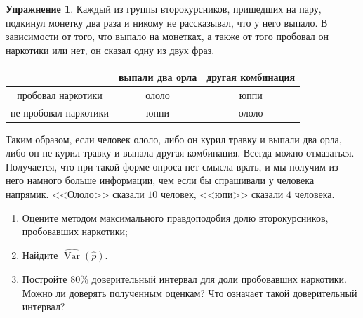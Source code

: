 \documentclass[12pt, a4paper, oneside]{extreport}
\DeclareMathOperator{\Var}{Var}
\theoremstyle{plain}              %
\theoremstyle{definition}         %
\newtheorem{problem}{\color{myblue} Упражнение}
\begin{document}
\begin{problem} 
Каждый из группы второкурсников, пришедших на пару, подкинул монетку два раза и никому не рассказывал, что у него выпало. В зависимости от того, что выпало на монетках, а также от того пробовал он наркотики или нет, он сказал одну из двух фраз.
	
	\begin{center}
		\begin{tabular}{c|c|c}
		                                 &  выпали два орла   & другая комбинация   \\ \hline
пробовал наркотики      &   ололо                     &   юппи       \\ \hline
не пробовал наркотики &	  юппи	                     &   ололо      \\
		\end{tabular}
	\end{center}
	
Таким образом, если человек ололо, либо он курил травку и выпали два орла, либо он не курил травку и выпала другая комбинация. Всегда можно отмазаться. Получается, что при такой форме опроса нет смысла врать, и мы получим из него намного больше информации, чем если бы спрашивали у человека напрямик.  <<Ололо>> сказали $10$ человек, <<юпи>> сказали $4$ человека.

\begin{enumerate}
	\item  Оцените методом максимального правдоподобия долю второкурсников, пробовавших наркотики;
	\item Найдите $\hat{\Var}(\hat p)$. 
	\item Постройте $80\%$ доверительный интервал для доли пробовавших наркотики. Можно ли доверять полученным оценкам? Что означает такой доверительный интервал? 
\end{enumerate}
\end{problem}
\end{document}
